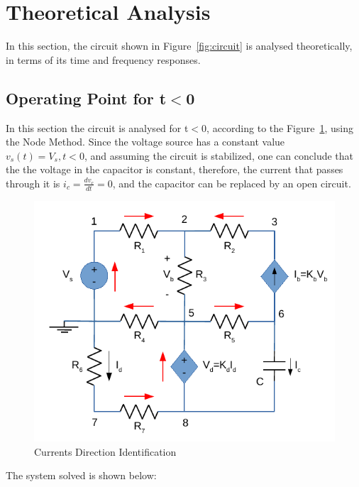 \section{Theoretical Analysis}
\label{sec:analysis}

In this section, the circuit shown in Figure~\ref{fig:circuit} is analysed
theoretically, in terms of its time and frequency responses.

\subsection{Operating Point for t$<$0}
\label{subsec:tb0}

In this section the circuit is analysed for t$<$0, according to the Figure~\ref{fig:NodeMethod}, using the Node Method. Since the voltage source has a constant value $v_s(t)=V_s, t<0$, and assuming the circuit is stabilized, one can conclude that the the voltage in the capacitor is constant, therefore, the current that passes through it is $i_c=\frac{dv_c}{dt}=0$, and the capacitor can be replaced by an open circuit.\par

\begin{figure}[H] \centering
  \includegraphics[width=0.7\linewidth]{NodeMethod.pdf}
  \caption{Currents Direction Identification}
  \label{fig:NodeMethod}
\end{figure}

The system solved is shown below:\par

